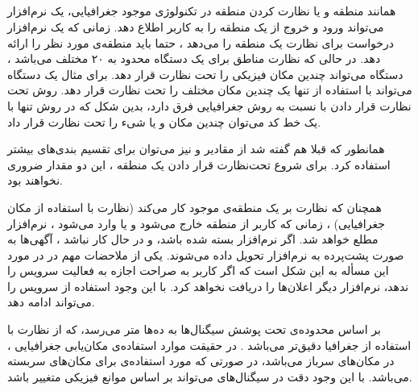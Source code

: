 \documentclass[oneside]{report}
\begin{document}
\subsection{{\normalsize {}}}
همانند 
{\normalsize {}} 
منطقه و یا نظارت کردن منطقه در تکنولوژی موجود جغرافیایی، یک نرم‌افزار می‌تواند ورود و خروج از یک منطقه را به کاربر اطلاع دهد. زمانی که یک نرم‌افزار درخواست برای نظارت یک منطقه را می‌دهد ، حتما باید 
{\normalsize {}}
منطقه‌ی مورد نظر را ارائه دهد. در حالی که نظارت مناطق برای یک دستگاه محدود به ۲۰ 
{\normalsize {}}
مختلف می‌باشد ، دستگاه می‌تواند چندین مکان فیزیکی را تحت نظارت قرار دهد. برای مثال یک دستگاه می‌تواند با استفاده از تنها یک 
{\normalsize {}}
چندین مکان مختلف را تحت نظارت قرار دهد. روش تحت نظارت قرار دادن با 
{\normalsize {}}
نسبت به روش جغرافیایی فرق دارد، بدین شکل که در روش 
{\normalsize {}}
تنها با یک خط کد می‌توان چندین مکان و یا شیء را تحت نظارت قرار داد. 

همانطور که قبلا هم گفته شد از مقادیر 
{\normalsize {}}
 و 
{\normalsize {}}
نیز می‌توان برای تقسیم بندی‌های بیشتر استفاده کرد. برای شروع تحت‌نظارت قرار دادن یک منطقه ، این دو مقدار ضروری نخواهند بود. 

همچنان که نظارت بر یک منطقه‌ی موجود کار می‌کند (نظارت با استفاده از مکان جغرافیایی) ، زمانی که کاربر از منطقه‌ خارج می‌شود  و یا وارد می‌شود ، نرم‌افزار مطلع خواهد شد. اگر نرم‌افزار بسته شده باشد، و در حال کار نباشد ، آگهی‌ها 
		       	به صورت پشت‌پرده 
		       	به نرم‌افزار تحویل داده می‌شوند.  یکی از ملاحضات مهم در 
{\normalsize {}}
در مورد این مسأله به این شکل است که اگر کاربر به صراحت اجازه به فعالیت سرویس 
{\normalsize {}}
را ندهد، نرم‌افزار دیگر اعلان‌ها را دریافت نخواهد کرد.  با این وجود استفاده از سرویس
{\normalsize {}}
را می‌تواند ادامه دهد.

 بر اساس 
 {\normalsize {}}
 محدوده‌ی تحت پوشش سیگنال‌ها به ده‌ها متر می‌رسد، که از نظارت با استفاده از جغرافیا دقیق‌تر می‌باشد . 
 در حقیقت موارد استفاده‌ی مکان‌یابی جغرافیایی ، در مکان‌های سرباز می‌باشد، در صورتی که مورد استفاده‌ی 
 {\normalsize {}}
 برای مکان‌های سربسته می‌باشد. با این وجود دقت در سیگنال‌های 
 {\normalsize {}}
 می‌تواند بر اساس موانع فیزیکی متغییر باشد. 
  		       	
\end{document}
